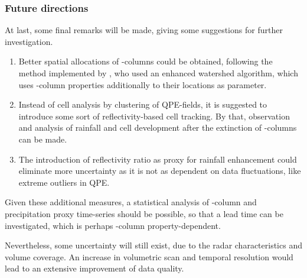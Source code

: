 \subsubsection{Future directions}
At last, some final remarks will be made, giving some suggestions for further investigation.
\begin{enumerate}
	\item Better spatial allocations of \zdr-columns could be obtained, following the method implemented by \textcite{zdr-tracking}, who used an enhanced watershed algorithm, which uses \zdr-column properties additionally to their locations as parameter.
	\item Instead of cell analysis by clustering of QPE-fields, it is suggested to introduce some sort of reflectivity-based cell tracking. By that, observation and analysis of rainfall and cell development after the extinction of \zdr-columns can be made.
	\item The introduction of reflectivity ratio as proxy for rainfall enhancement could eliminate more uncertainty as it is not as dependent on data fluctuations, like extreme outliers in QPE.
\end{enumerate}
Given these additional measures, a statistical analysis of \zdr-column and precipitation proxy time-series should be possible, so that a lead time can be investigated, which is perhaps \zdr-column property-dependent.

Nevertheless, some uncertainty will still exist, due to the radar characteristics and volume coverage. An increase in volumetric scan and temporal resolution would lead to an extensive improvement of data quality.


